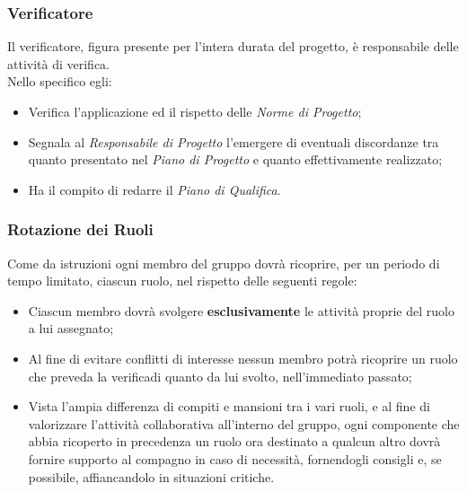 \subsubsection{Verificatore}
	Il verificatore, figura presente per l'intera durata del progetto, è responsabile delle attività di 									verifica\glossario.\\
	Nello specifico egli:
	\begin{itemize}
	\item Verifica l'applicazione ed il rispetto delle \textit{Norme di Progetto};
	\item Segnala al \textit{Responsabile di Progetto} l'emergere di eventuali discordanze tra quanto presentato nel 			\textit{Piano di Progetto} e quanto effettivamente realizzato;
	\item Ha il compito di redarre il \textit{Piano di Qualifica}.
	\end{itemize}

\subsubsection{Rotazione dei Ruoli}
	Come da istruzioni ogni membro del gruppo dovrà ricoprire, per un periodo di tempo limitato, ciascun ruolo, nel 			rispetto delle seguenti regole:
	\begin{itemize}
	\item Ciascun membro dovrà svolgere \textbf{esclusivamente} le attività proprie del ruolo a lui assegnato;
	\item Al fine di evitare conflitti di interesse nessun membro potrà ricoprire un ruolo che preveda la 									verifica\glossario di quanto da lui svolto, nell'immediato passato;
	\item Vista l'ampia differenza di compiti e mansioni tra i vari ruoli, e al fine di valorizzare l'attività 						collaborativa all'interno del gruppo, ogni componente che abbia ricoperto in precedenza un ruolo ora destinato 			a qualcun altro dovrà fornire supporto al compagno in caso di necessità, fornendogli consigli e, se possibile, 			affiancandolo in situazioni critiche.
	\end{itemize}
